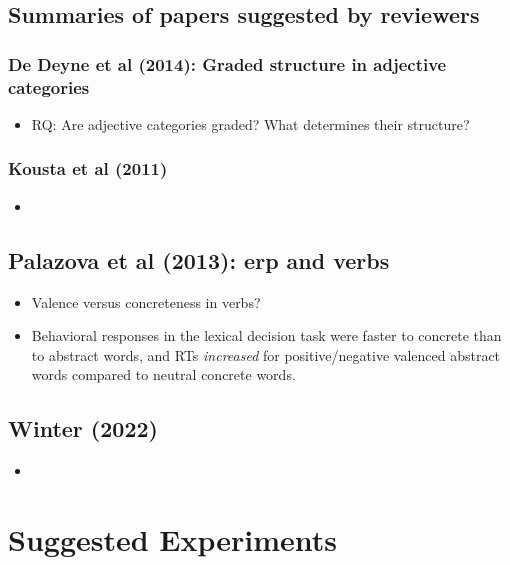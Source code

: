\documentclass[12pt,letterpaper,table,svgnames,dvipsnames]{article}
\begin{document}
\subsection{Summaries of papers suggested by reviewers}

\subsubsection{De Deyne et al (2014): Graded structure in adjective categories}

\begin{itemize}
    \item RQ: Are adjective categories graded? What determines their structure?
\end{itemize}


\subsubsection{Kousta et al (2011)}

\begin{itemize}
    \item 
\end{itemize}

\subsection{Palazova et al (2013): erp and verbs}


\begin{itemize}
    \item Valence versus concreteness in verbs?
    \item Behavioral responses in the lexical decision task were faster to concrete than to abstract words, and RTs \emph{increased} for positive/negative valenced abstract words compared to neutral concrete words.
\end{itemize}


\subsection{Winter (2022)}

\begin{itemize}
    \item 
\end{itemize}


\section{Suggested Experiments}
\end{document}
